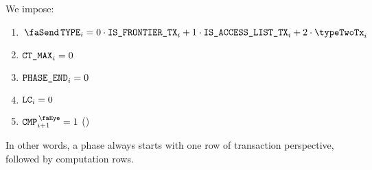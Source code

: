 \begin{center}
\end{center}

We impose:
\begin{enumerate}
	\item $\txType_{i} =  0 \cdot \typeZeroTx_{i} + 1 \cdot \typeOneTx_{i} + 2 \cdot \typeTwoTx_{i}$
	\item $\texttt{CT\_MAX}_{i} = 0$  
	\item $\texttt{PHASE\_END}_{i} = 0$
	\item $\texttt{LC}_{i} = 0$ 
	\item $\isCmp_{i+1} = 1$ (\trash)
\end{enumerate}

In other words, a phase always starts with one row of transaction perspective, followed by computation rows.